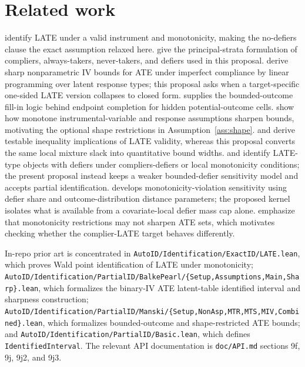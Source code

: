 \documentclass[11pt]{article}
\theoremstyle{definition}
\theoremstyle{plain}
\theoremstyle{remark}
\begin{document}
\section{Related work}
\citet{ImbensAngrist1994} identify LATE under a valid instrument and monotonicity, making the no-defiers clause the exact assumption relaxed here.  \citet{AngristImbensRubin1996} give the principal-strata formulation of compliers, always-takers, never-takers, and defiers used in this proposal.  \citet{BalkePearl1997} derive sharp nonparametric IV bounds for ATE under imperfect compliance by linear programming over latent response types; this proposal asks when a target-specific one-sided LATE version collapses to closed form.  \citet{Manski1990} supplies the bounded-outcome fill-in logic behind endpoint completion for hidden potential-outcome cells.  \citet{ManskiPepper2000} show how monotone instrumental-variable and response assumptions sharpen bounds, motivating the optional shape restrictions in Assumption~\ref{ass:shape}.  \citet{Kitagawa2015} and \citet{HuberMellace2015} derive testable inequality implications of LATE validity, whereas this proposal converts the same local mixture slack into quantitative bound widths.  \citet{deChaisemartin2017} and \citet{DahlHuberMellace2023} identify LATE-type objects with defiers under compliers-defiers or local monotonicity conditions; the present proposal instead keeps a weaker bounded-defier sensitivity model and accepts partial identification.  \citet{Noack2021} develops monotonicity-violation sensitivity using defier share and outcome-distribution distance parameters; the proposed kernel isolates what is available from a covariate-local defier mass cap alone.  \citet{BaiHuangMoonShaikhVytlacil2024} emphasize that monotonicity restrictions may not sharpen ATE sets, which motivates checking whether the complier-LATE target behaves differently.

In-repo prior art is concentrated in \texttt{AutoID/Identification/ExactID/LATE.lean}, which proves Wald point identification of LATE under monotonicity; \texttt{AutoID/Identification/PartialID/BalkePearl/\{Setup,Assumptions,Main,Sharp\}.lean}, which formalizes the binary-IV ATE latent-table identified interval and sharpness construction; \texttt{AutoID/Identification/PartialID/Manski/\{Setup,NonAsp,MTR,MTS,MIV,Combined\}.lean}, which formalizes bounded-outcome and shape-restricted ATE bounds; and \texttt{AutoID/Identification/PartialID/Basic.lean}, which defines \texttt{IdentifiedInterval}.  The relevant API documentation is \texttt{doc/API.md} sections 9f, 9j, 9j2, and 9j3.
\end{document}
